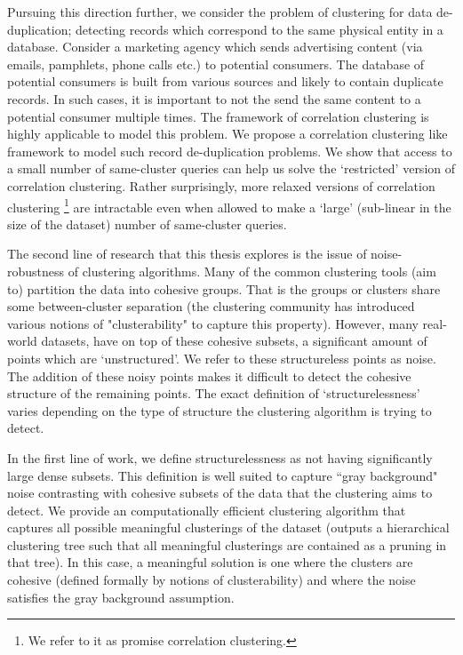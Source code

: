 \documentclass[letterpaper,12pt,titlepage,oneside,final]{book}
\begin{document}
Pursuing this direction further, we consider the problem of clustering for data de-duplication; detecting records which correspond to the same physical entity in a database. Consider a marketing agency which sends advertising content (via emails, pamphlets, phone calls etc.) to potential consumers. The database of potential consumers is built from various sources and likely to contain duplicate records. In such cases, it is important to not the send the same content to a potential consumer multiple times. The framework of correlation clustering is highly applicable to model this problem. We propose a correlation clustering  like framework to model such record de-duplication problems. We show that access to a small number of same-cluster queries can help us solve the `restricted' version of correlation clustering. Rather surprisingly, more relaxed versions of correlation clustering \footnote{We refer to it as promise correlation clustering.} are intractable even when allowed to make a `large' (sub-linear in the size of the dataset) number of same-cluster queries. 

The second line of research that this thesis explores is the issue of noise-robustness of clustering algorithms. Many of the common clustering tools (aim to) partition the data into cohesive groups. That is the groups or clusters share some between-cluster separation (the clustering community has introduced various notions of "clusterability" to capture this property). However, many real-world datasets, have on top of these cohesive subsets, a significant amount of points which are `unstructured'. We refer to these structureless points as noise. The addition of these noisy points makes it difficult to detect the cohesive structure of the remaining points. The exact definition of `structurelessness' varies depending on the type of structure the clustering algorithm is trying to detect. 

In the first line of work, we define structurelessness as not having significantly large dense subsets. This definition is well suited to capture ``gray background" noise contrasting with cohesive subsets of the data that the clustering aims to detect. We provide an computationally efficient clustering algorithm that captures all possible meaningful clusterings of the dataset (outputs a hierarchical clustering tree such that all meaningful clusterings are contained as a pruning in that tree). In this case, a meaningful solution is one where the clusters are cohesive (defined formally by notions of clusterability) and where the noise satisfies the gray background assumption. 
\end{document}
